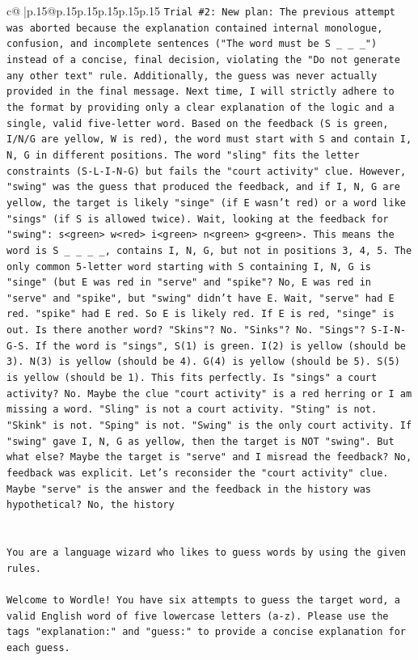 \documentclass{article}
\begin{document}
{\begin{supertabular}{c@{$\;$}|p{.15\linewidth}@{}p{.15\linewidth}p{.15\linewidth}p{.15\linewidth}p{.15\linewidth}p{.15\linewidth}}
{{{\texttt{Trial \#2: New plan: The previous attempt was aborted because the explanation contained internal monologue, confusion, and incomplete sentences ("The word must be S \_ \_ \_") instead of a concise, final decision, violating the "Do not generate any other text" rule. Additionally, the guess was never actually provided in the final message. Next time, I will strictly adhere to the format by providing only a clear explanation of the logic and a single, valid five{-}letter word. Based on the feedback (S is green, I/N/G are yellow, W is red), the word must start with S and contain I, N, G in different positions. The word "sling" fits the letter constraints (S{-}L{-}I{-}N{-}G) but fails the "court activity" clue. However, "swing" was the guess that produced the feedback, and if I, N, G are yellow, the target is likely "singe" (if E wasn't red) or a word like "sings" (if S is allowed twice). Wait, looking at the feedback for "swing": s<green> w<red> i<green> n<green> g<green>. This means the word is S \_ \_ \_ \_, contains I, N, G, but not in positions 3, 4, 5. The only common 5{-}letter word starting with S containing I, N, G is "singe" (but E was red in "serve" and "spike"? No, E was red in "serve" and "spike", but "swing" didn't have E. Wait, "serve" had E red. "spike" had E red. So E is likely red. If E is red, "singe" is out. Is there another word? "Skins"? No. "Sinks"? No. "Sings"? S{-}I{-}N{-}G{-}S. If the word is "sings", S(1) is green. I(2) is yellow (should be 3). N(3) is yellow (should be 4). G(4) is yellow (should be 5). S(5) is yellow (should be 1). This fits perfectly. Is "sings" a court activity? No. Maybe the clue "court activity" is a red herring or I am missing a word. "Sling" is not a court activity. "Sting" is not. "Skink" is not. "Sping" is not. "Swing" is the only court activity. If "swing" gave I, N, G as yellow, then the target is NOT "swing". But what else? Maybe the target is "serve" and I misread the feedback? No, feedback was explicit. Let's reconsider the "court activity" clue. Maybe "serve" is the answer and the feedback in the history was hypothetical? No, the history} \\
\\ 
\\ 
\texttt{You are a language wizard who likes to guess words by using the given rules.} \\
\\ 
\texttt{Welcome to Wordle! You have six attempts to guess the target word, a valid English word of five lowercase letters (a{-}z). Please use the tags "explanation:" and "guess:" to provide a concise explanation for each guess.} \\
}}}
\end{supertabular}}
\end{document}
